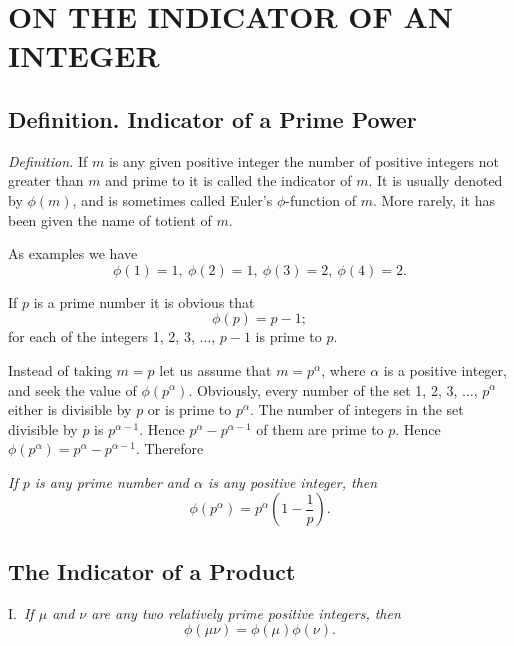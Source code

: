 \documentclass[oneside]{book}
\begin{document}
\chapter{ON THE INDICATOR OF AN INTEGER}%

\section{Definition. Indicator of a Prime Power}\label{s14}%

\emph{Definition.} If $m$ is any given positive integer the number
of positive integers not greater than $m$ and prime to it is called
the indicator of $m$. It is usually denoted by $\phi(m)$, and is
sometimes called Euler's $\phi$-function of $m$.%
 More rarely, it has
been given the name of totient of $m$.

As examples we have
\begin{equation*}
\phi(1) = 1,\ \phi(2) = 1,\ \phi(3) = 2,\ \phi(4) = 2.
\end{equation*}

If $p$ is a prime number it is obvious that
\begin{equation*}
\phi(p) = p - 1;
\end{equation*}
for each of the integers 1, 2, 3, $\ldots$, $p-1$ is prime to $p$.

Instead of taking $m = p$ let us assume that $m = p^\alpha$, where
$\alpha$ is a positive integer, and seek the value of
$\phi(p^\alpha)$. Obviously, every number of the set 1, 2, 3,
$\ldots$, $p^\alpha$ either is divisible by $p$ or is prime to
$p^\alpha$. The number of integers in the set divisible by $p$ is
$p^{\alpha - 1}$. Hence $p^\alpha-p^{\alpha-1}$ of them are prime to
$p$. Hence $\phi(p^\alpha) = p^\alpha-p^{\alpha-1}$. Therefore

\emph{If $p$ is any prime number and $\alpha$ is any positive
integer, then}
\begin{equation*}
\phi(p^\alpha) = p^\alpha \left ( 1 - \frac{1}{p} \right ).
\end{equation*}

\section{The Indicator of a Product}\label{s15}%

I.~\emph{If $\mu$ and $\nu$ are any two relatively prime positive
integers, then}
\begin{equation*}
\phi(\mu\nu) = \phi(\mu) \phi(\nu).
\end{equation*}
\end{document}
